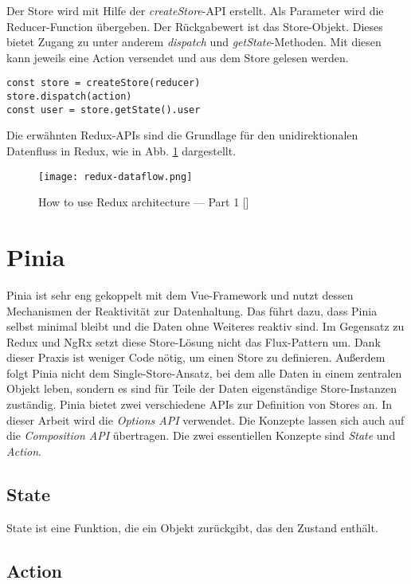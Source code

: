Der Store wird mit Hilfe der \textit{createStore}-API erstellt. Als Parameter wird die Reducer-Function übergeben. Der Rückgabewert ist das Store-Objekt. Dieses bietet Zugang zu unter anderem \textit{dispatch} und \textit{getState}-Methoden. Mit diesen kann jeweils eine Action versendet und aus dem Store gelesen werden.

\begin{lstlisting}
const store = createStore(reducer)
store.dispatch(action)
const user = store.getState().user
\end{lstlisting}

Die erwähnten Redux-APIs sind die Grundlage für den unidirektionalen Datenfluss in Redux, wie in Abb. \ref{fig:redux-dataflow} dargestellt.

\begin{figure}[H]
  \texttt{[image: redux-dataflow.png]}
  \caption{How to use Redux architecture — Part 1 [\citeyear{reduxDataFlow}]}
  \label{fig:redux-dataflow}
\end{figure}

\section{Pinia}

Pinia ist sehr eng gekoppelt mit dem Vue-Framework und nutzt dessen Mechanismen der Reaktivität zur Datenhaltung. Das führt dazu, dass Pinia selbst minimal bleibt und die Daten ohne Weiteres reaktiv sind. Im Gegensatz zu Redux und NgRx setzt diese Store-Lösung nicht das Flux-Pattern um. Dank dieser Praxis ist weniger Code nötig, um einen Store zu definieren. Außerdem folgt Pinia nicht dem Single-Store-Ansatz, bei dem alle Daten in einem zentralen Objekt leben, sondern es sind für Teile der Daten eigenständige Store-Instanzen zuständig. Pinia bietet zwei verschiedene APIs zur Definition von Stores an. In dieser Arbeit wird die \textit{Options API} verwendet. Die Konzepte lassen sich auch auf die \textit{Composition API} übertragen.\cite{piniaDefiningAStore} Die zwei essentiellen Konzepte sind \textit{State} und \textit{Action}.

\subsection{State}

State ist eine Funktion, die ein Objekt zurückgibt, das den Zustand enthält.

\subsection{Action}


